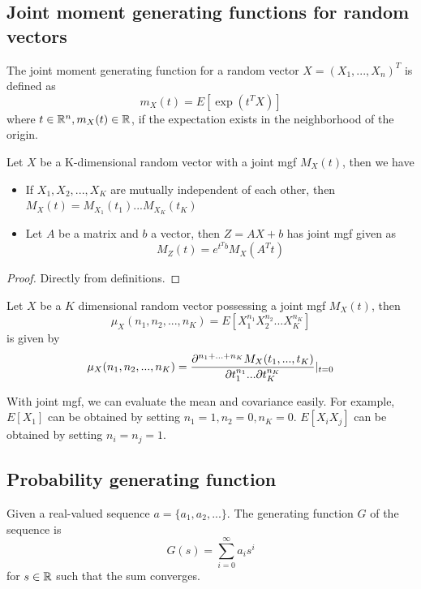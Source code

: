 \begin{refsection}
\subsection{Joint moment generating functions for random vectors}
\begin{definition}
The joint moment generating function for a random vector $X=(X_1,...,X_n)^T$ is defined as
$$m_X(t) = E[\exp(t^TX)]$$
where $t\in \mathbb{R}^n, m_X(t)\in \mathbb{R}$, if the expectation exists in the neighborhood of the origin. 
\end{definition}



\begin{lemma}
	\label{ch:theory-of-probability:th:propertiesjointmgf}
	Let $X$ be a K-dimensional random vector with a joint mgf $M_X(t)$, then we have
	\begin{itemize}
		\item If $X_1,X_2,...,X_K$ are mutually independent of each other, then $M_X(t) = M_{X_1}(t_1)...M_{X_K}(t_K)$
		\item Let $A$ be a matrix and $b$ a vector, then $Z = AX+b$ has joint mgf given as
		$$M_Z(t) = e^{t^Tb} M_X(A^Tt)$$
	\end{itemize}
	\end{lemma}
		\begin{proof}
			Directly from definitions.
		\end{proof}



\begin{lemma}
Let $X$ be a $K$ dimensional random vector possessing a joint mgf $M_X(t)$, then 
$$\mu_X(n_1,n_2,...,n_K) = E[X_1^{n_1}X_2^{n_2}...X_K^{n_K}]$$
is given by 
$$\mu_X(n_1,n_2,...,n_K)=\frac{\partial^{n_1+...+n_K} M_X(t_1,...,t_K)}{\partial t_1^{n_1}...\partial t_K^{n_K}}|_{t = 0}$$
\end{lemma}

\begin{remark}
With joint mgf, we can evaluate the mean and covariance easily. For example, $E[X_1]$ can be obtained by setting $n_1 = 1, n_2 = 0, n_K = 0$. $E[X_iX_j]$ can be obtained by setting $n_i = n_j = 1$.	
\end{remark}

\subsection{Probability generating function}
\begin{definition}\cite[148]{grimmett2001probability}
Given a  real-valued sequence $a =\{a_1,a_2,...\}$. The generating function $G$ of the sequence is 
$$G(s) = \sum_{i=0}^\infty a_i s^i$$
for $s\in \mathbb{R}$ such that the sum converges.
\end{definition}


\end{refsection}
